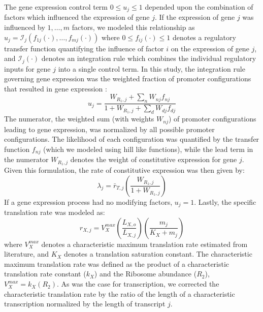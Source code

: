 \documentclass[12pt]{article}
\begin{document}
The gene expression control term $0\leq u_{j}\leq 1$ depended upon the combination of factors which influenced the expression of gene $j$.
If the expression of gene $j$ was influenced by $1,\dots,m$ factors, we modeled this relationship as
$u_{j}=\mathcal{I}_{j}\left(f_{1j}\left(\cdot\right),\hdots,f_{mj}\left(\cdot\right)\right)$
where $0\leq f_{ij}\left(\cdot\right)\leq 1$ denotes a regulatory transfer function quantifying the influence of factor $i$ on the expression of gene $j$,
and $\mathcal{I}_{j}\left(\cdot\right)$ denotes an integration rule which combines the individual regulatory inputs for gene $j$ into a single control term.
In this study, the integration rule governing gene expression was the weighted fraction of promoter configurations that resulted in gene expression \cite{Moon:2012ab}:
\begin{equation}
	{u}_{j} = \frac{W_{R_{1},j}+\displaystyle\sum_{n}W_{nj}f_{nj}}{1+W_{R_{1},j}+\displaystyle\sum_{d}W_{dj}f_{dj}}
\end{equation}
The numerator, the weighted sum (with weights $W_{nj}$) of promoter configurations leading to gene expression, was normalized by all possible promoter configurations.
The likelihood of each configuration was quantified by the transfer function $f_{nj}$ (which we modeled using hill like functions), while
the lead term in the numerator $W_{R_{1},j}$ denotes the weight of constitutive expression for gene $j$.
Given this formulation, the rate of constitutive expression was then given by:
\begin{equation}
	\lambda_{j} = \bar{r}_{T,j}\left(\frac{W_{R_{1},j}}{1+W_{R_{1},j}}\right)
\end{equation}
If a gene expression process had no modifying factors, $u_{j}=1$.
Lastly, the specific translation rate was modeled as:
\begin{equation}
	r_{X,j} = V^{max}_{X}\left(\frac{L_{X,o}}{L_{X,j}}\right)\left(\frac{m_{j}}{K_{X}+m_{j}}\right)
\end{equation}
where $V^{max}_{X}$ denotes a characteristic maximum translation rate estimated from literature, and $K_{X}$ denotes a translation saturation constant.
The characteristic maximum translation rate was defined as the product of a characteristic translation rate constant ($k_{X}$)
and the Ribosome abundance ($R_{2}$), $V^{max}_{X} = k_{X}\left(R_{2}\right)$. As was the case for transcription,
we corrected the characteristic translation rate by the ratio of the length of a characteristic transcription normalized by the length of transcript $j$.
\end{document}

